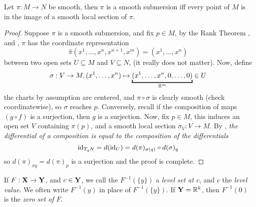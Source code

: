 \documentclass[../main-manifolds.tex]{subfiles}
\begin{document}
\begin{wts}\label{lee-chp4:characterization-of-smooth-submersion}
    Let $\pi:M\to N$ be smooth, then $\pi$ is a smooth submersion iff every point of $M$ is in the image of a smooth local section of $\pi$.
\end{wts}
\begin{proof}
    Suppose $\pi$ is a smooth submersion, and fix $p\in M$, by the Rank Theorem , and , $\pi$ has the coordinate representation
    \[
        \hat{\pi}(x^1,\ldots,x^n,x^{n+1},x^m)=(x^1,\ldots,x^n)
    \]
    between two open sets $U\subseteq M$ and $V\subseteq N$, (it really does not matter). Now, define
    \[
        \sigma: V\to M, (x^1,\ldots,x^n)\mapsto \underbracket{(x^1,\ldots,x^n,0,\ldots,0)}_{\realm}\in U
    \]
    the charts by assumption are centered, and $\pi\circ\sigma$ is clearly smooth (check coordinatewise), so $\sigma$ reaches $p$. Conversely, recall if the composition of maps $(g\circ f)$ is a surjection, then $g$ is a surjection. Now, fix $p\in M$, this induces an open set $V$ containing $\pi(p)$, and a smooth local section $\sigma_V: V\to M$. By , \emph{the differential of a composition is equal to the composition of the differentials}
    \[
        \operatorname{id}_{T_{q}N}=d(\operatorname{id}_{U})=d(\pi)_{\sigma(q)}\circ d(\sigma)_{q}
    \]
    so $d(\pi)_{\sigma{q}} = d(\pi)_{p}$ is a surjection and the proof is complete.
\end{proof}

If $F:{\mathbf{X}}\to{\mathbf{Y}}$, and $c\in {\mathbf{Y}}$, we call the $F^{-1}(\{y\})$ a \emph{level set at $c$}, and $c$ the \emph{level value}. We often write $F^{-1}(y)$ in place of $F^{-1}(\{y\})$. If ${\mathbf{Y}}={\mathbb{R}^k}$, then $F^{-1}(0)$ is the \emph{zero set of $F$}.
\end{document}
